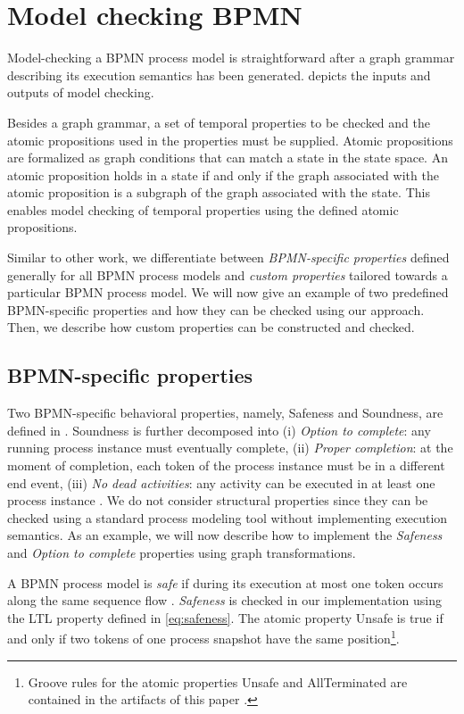 \documentclass[adraft, copyright, creativecommons]{eptcs} %
\begin{document}
\section{Model checking BPMN} \label{sec:modelChecking}

Model-checking a BPMN process model is straightforward after a graph grammar describing its execution semantics has been generated.
 depicts the inputs and outputs of model checking.

Besides a graph grammar, a set of temporal properties to be checked and the atomic propositions used in the properties must be supplied.
Atomic propositions are formalized as graph conditions that can match a state in the state space.
An atomic proposition holds in a state if and only if the graph associated with the atomic proposition is a subgraph of the graph associated with the state. %
This enables model checking of temporal properties using the defined atomic propositions.

Similar to other work, we differentiate between \emph{BPMN-specific properties} defined generally for all BPMN process models and \emph{custom properties} tailored towards a particular BPMN process model.
We will now give an example of two predefined BPMN-specific properties and how they can be checked using our approach.
Then, we describe how custom properties can be constructed and checked.

\subsection{BPMN-specific properties}
Two BPMN-specific behavioral properties, namely, Safeness and Soundness, are defined in \cite{corradiniClassificationBPMNCollaborations2018}.
Soundness is further decomposed into (i) \emph{Option to complete}: any running process instance must eventually complete, (ii) \emph{Proper completion}: at the moment of completion, each token of the process instance must be in a different end event, (iii) \emph{No dead activities}: any activity can be executed in at least one process instance \cite{corradiniClassificationBPMNCollaborations2018}.
We do not consider structural properties since they can be checked using a standard process modeling tool without implementing execution semantics.
As an example, we will now describe how to implement the \emph{Safeness} and \emph{Option to complete} properties using graph transformations.

A BPMN process model is \emph{safe} if during its execution at most one token occurs along the same sequence flow \cite{corradiniClassificationBPMNCollaborations2018}.
\emph{Safeness} is checked in our implementation using the LTL property defined in \eqref{eq:safeness}.
The atomic property \textsf{Unsafe} is true if and only if two tokens of one process snapshot have the same position\footnote{\label{footnote:atomicProps}Groove rules for the atomic properties \textsf{Unsafe} and \textsf{AllTerminated} are contained in the artifacts of this paper \cite{timkrauterArtifactsTERMGRAPH2022}.}.
\end{document}
